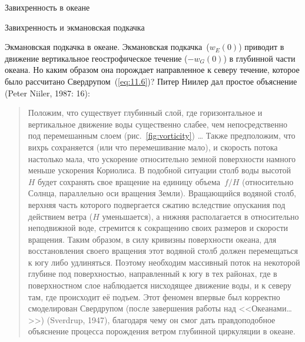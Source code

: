 \begin{chapter}{Завихренность в океане}
\begin{section}{Завихренность и экмановская подкачка}
\begin{paragraph}{Экмановская подкачка в океане.}
Экмановская подкачка~($w_E (0)$) приводит в движение вертикальное
геострофическое течение ($-w_G(0)$) в глубинной части океана. Но каким образом
она порождает направленное к северу течение, которое было рассчитано
Свердрупом~(\ref{eq:11.6})? Питер Ниилер дал простое 
объяснение (Peter Niiler, 1987: 16):
%
\begin{quotation}
Положим, что существует глубинный слой, где горизонтальное и
вертикальное движение воды существенно слабее, чем непосредственно под
перемешанным слоем
(рис.~\ref{fig:vorticity}) \dots{} Также предположим, что вихрь
сохраняется (или что перемешивание мало), и скорость потока настолько мала,
что ускорение относительно земной поверхности намного меньше ускорения
Кориолиса. В подобной ситуации столб воды высотой~$H$ будет сохранять
свое вращение на единицу объема~$f/H$ (относительно Солнца, параллельно
оси вращения Земли). Вращающийся водяной столб, верхняя часть которого 
подвергается сжатию вследствие опускания под действием ветра ($H$ уменьшается), 
а нижняя располагается в относительно неподвижной воде, стремится к 
сокращению своих размеров и скорости вращения. Таким образом, в силу
кривизны поверхности океана, для восстановления своего вращения этот 
водяной столб должен перемещаться к югу либо удлиняться.
Поэтому необходим массивный поток на некоторой глубине под
поверхностью, направленный к югу в тех районах, где в поверхностном слое
наблюдается нисходящее движение воды, и к северу там, где происходит её 
подъем. Этот феномен впервые был корректно смоделирован
Свердрупом (после завершения работы над <<Океанами\dots{}>>) (Sverdrup, 1947), 
благодаря чему он смог дать правдоподобное объяснение процесса порождения 
ветром глубинной циркуляции в океане.
\end{quotation}

\end{paragraph}
\end{section}
\end{chapter}
